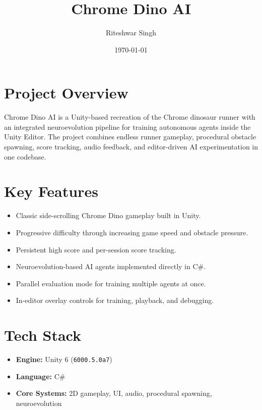 \documentclass[11pt]{article}
\title{\textbf{Chrome Dino AI}}
\author{Riteshwar Singh}
\date{\today}
\begin{document}
\maketitle

\section{Project Overview}
Chrome Dino AI is a Unity-based recreation of the Chrome dinosaur runner with an integrated neuroevolution pipeline for training autonomous agents inside the Unity Editor. The project combines endless runner gameplay, procedural obstacle spawning, score tracking, audio feedback, and editor-driven AI experimentation in one codebase.

\section{Key Features}
\begin{itemize}[leftmargin=1.5em]
    \item Classic side-scrolling Chrome Dino gameplay built in Unity.
    \item Progressive difficulty through increasing game speed and obstacle pressure.
    \item Persistent high score and per-session score tracking.
    \item Neuroevolution-based AI agents implemented directly in C\#.
    \item Parallel evaluation mode for training multiple agents at once.
    \item In-editor overlay controls for training, playback, and debugging.
\end{itemize}

\section{Tech Stack}
\begin{itemize}[leftmargin=1.5em]
    \item \textbf{Engine:} Unity 6 (\texttt{6000.5.0a7})
    \item \textbf{Language:} C\#
    \item \textbf{Core Systems:} 2D gameplay, UI, audio, procedural spawning, neuroevolution
\end{itemize}
\end{document}
